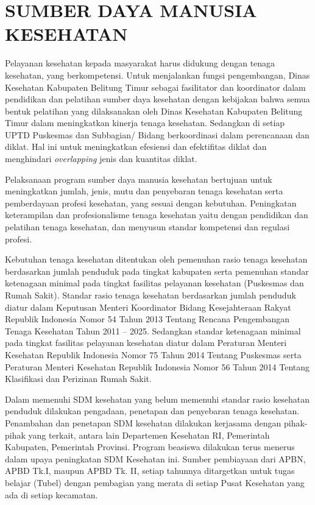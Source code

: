 \chapter{SUMBER DAYA MANUSIA KESEHATAN}
Pelayanan kesehatan kepada masyarakat harus didukung dengan tenaga kesehatan, yang berkompetensi. Untuk menjalankan fungsi pengembangan, Dinas Kesehatan Kabupaten Belitung Timur sebagai fasilitator dan koordinator dalam pendidikan dan pelatihan sumber daya kesehatan dengan kebijakan bahwa semua bentuk pelatihan yang dilaksanakan oleh Dinas Kesehatan Kabupaten Belitung Timur dalam meningkatkan kinerja tenaga kesehatan. Sedangkan di setiap UPTD Puskesmas dan Subbagian/ Bidang berkoordinasi dalam perencanaan dan diklat. Hal ini untuk meningkatkan efesiensi dan efektifitas diklat dan menghindari \textit{overlapping} jenis dan kuantitas diklat.

Pelaksanaan program sumber daya manusia kesehatan bertujuan untuk meningkatkan jumlah, jenis, mutu dan penyebaran tenaga kesehatan serta pemberdayaan profesi kesehatan, yang sesuai dengan kebutuhan. Peningkatan keterampilan dan profesionalisme tenaga kesehatan yaitu dengan pendidikan dan pelatihan tenaga kesehatan, dan menyusun standar kompetensi dan regulasi profesi.

Kebutuhan tenaga kesehatan ditentukan oleh pemenuhan rasio tenaga kesehatan berdasarkan jumlah penduduk pada tingkat kabupaten serta pemenuhan standar ketenagaan minimal pada tingkat fasilitas pelayanan kesehatan (Puskesmas dan Rumah Sakit). Standar rasio tenaga kesehatan berdasarkan jumlah penduduk diatur dalam Keputusan Menteri Koordinator Bidang Kesejahteraan Rakyat Republik Indonesia Nomor 54 Tahun 2013 Tentang Rencana Pengembangan Tenaga Kesehatan Tahun 2011 – 2025. Sedangkan standar ketenagaan minimal pada tingkat fasilitas pelayanan kesehatan
diatur dalam Peraturan Menteri Kesehatan Republik Indonesia Nomor 75 Tahun 2014 Tentang Puskesmas serta Peraturan Menteri Kesehatan Republik Indonesia Nomor 56 Tahun 2014 Tentang Klasifikasi dan Perizinan Rumah Sakit.

Dalam memenuhi SDM kesehatan yang belum memenuhi standar rasio kesehatan penduduk dilakukan pengadaan, penetapan dan penyebaran tenaga kesehatan. Penambahan dan penetapan SDM kesehatan dilakukan kerjasama dengan pihak-pihak yang terkait, antara lain Departemen Kesehatan RI, Pemerintah Kabupaten, Pemerintah Provinsi. Program beasiswa dilakukan terus menerus dalam upaya peningkatan SDM Kesehatan ini. Sumber pembiayaan dari APBN, APBD Tk.I, maupun APBD Tk. II, setiap tahunnya ditargetkan untuk tugas belajar (Tubel) dengan pembagian yang merata di setiap Pusat Kesehatan yang ada di setiap kecamatan.

